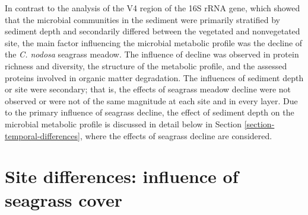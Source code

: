 \documentclass[
  12 pt,
]{book}
\begin{document}
In contrast to the analysis of the V4 region of the 16S rRNA gene, which showed that the microbial communities in the sediment were primarily stratified by sediment depth and secondarily differed between the vegetated and nonvegetated site, the main factor influencing the microbial metabolic profile was the decline of the \emph{C. nodosa} seagrass meadow. The influence of decline was observed in protein richness and diversity, the structure of the metabolic profile, and the assessed proteins involved in organic matter degradation. The influences of sediment depth or site were secondary; that is, the effects of seagrass meadow decline were not observed or were not of the same magnitude at each site and in every layer. Due to the primary influence of seagrass decline, the effect of sediment depth on the microbial metabolic profile is discussed in detail below in Section \ref{section-temporal-differences}, where the effects of seagrass decline are considered.

\hypertarget{section-site-differences}{%
\section{Site differences: influence of seagrass cover}\label{section-site-differences}}
\end{document}
